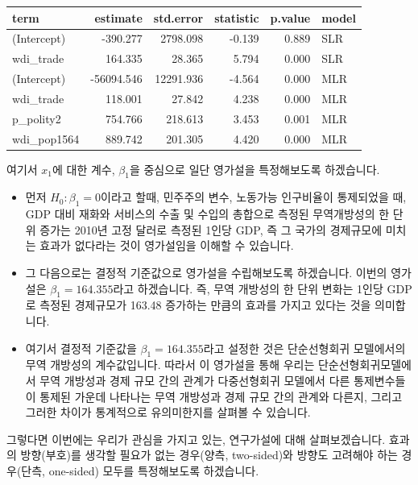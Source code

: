 \documentclass[
]{book}
\begin{document}
\begin{tabular}{l|r|r|r|r|l}
\hline
term & estimate & std.error & statistic & p.value & model\\
\hline
(Intercept) & -390.277 & 2798.098 & -0.139 & 0.889 & SLR\\
\hline
wdi\_trade & 164.335 & 28.365 & 5.794 & 0.000 & SLR\\
\hline
(Intercept) & -56094.546 & 12291.936 & -4.564 & 0.000 & MLR\\
\hline
wdi\_trade & 118.001 & 27.842 & 4.238 & 0.000 & MLR\\
\hline
p\_polity2 & 754.766 & 218.613 & 3.453 & 0.001 & MLR\\
\hline
wdi\_pop1564 & 889.742 & 201.305 & 4.420 & 0.000 & MLR\\
\hline
\end{tabular}

여기서 \(x_1\)에 대한 계수, \(\beta_1\)을 중심으로 일단 영가설을 특정해보도록 하겠습니다.

\begin{itemize}
\item
  먼저 \(H_0: \beta_1 = 0\)이라고 할때, 민주주의 변수, 노동가능 인구비율이 통제되었을 때, GDP 대비 재화와 서비스의 수출 및 수입의 총합으로 측정된 무역개방성의 한 단위 증가는 2010년 고정 달러로 측정된 1인당 GDP, 즉 그 국가의 경제규모에 미치는 효과가 없다라는 것이 영가설임을 이해할 수 있습니다.
\item
  그 다음으로는 결정적 기준값으로 영가설을 수립해보도록 하겠습니다. 이번의 영가설은 \(\beta_1 = 164.355\)라고 하겠습니다. 즉, 무역 개방성의 한 단위 변화는 1인당 GDP로 측정된 경제규모가 163.48 증가하는 만큼의 효과를 가지고 있다는 것을 의미합니다.
\item
  여기서 결정적 기준값을 \(\beta_1 = 164.355\)라고 설정한 것은 단순선형회귀 모델에서의 무역 개방성의 계수값입니다. 따라서 이 영가설을 통해 우리는 단순선형회귀모델에서 무역 개방성과 경제 규모 간의 관계가 다중선형회귀 모델에서 다른 통제변수들이 통제된 가운데 나타나는 무역 개방성과 경제 규모 간의 관계와 다른지, 그리고 그러한 차이가 통계적으로 유의미한지를 살펴볼 수 있습니다.
\end{itemize}

그렇다면 이번에는 우리가 관심을 가지고 있는, 연구가설에 대해 살펴보겠습니다. 효과의 방향(부호)를 생각할 필요가 없는 경우(양측, two-sided)와 방향도 고려해야 하는 경우(단측, one-sided) 모두를 특정해보도록 하겠습니다.
\end{document}
